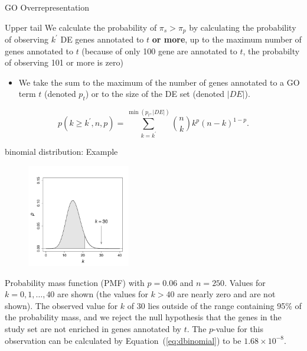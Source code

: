 \documentclass{beamer}
\begin{document}
\begin{frame}{GO Overrepresentation }
\begin{mybluebox}{Upper tail}
We calculate the probability of $\pi_{s}>\pi_p $ by calculating the probability of observing $k^{'}$ DE genes annotated to $t$ {\bf or more}, up to the maximum number of genes annotated to $t$ (because of only 100 gene are annotated to $t$, the probabilty of observing 101 or more is zero)
\end{mybluebox}

\begin{itemize}
\item  We take the sum to the maximum of the
number of genes annotated to a GO term $t$ (denoted $p_t$) or to the
size of the DE set (denoted $|\textit{DE}|$). 
\end{itemize}



\begin{equation}
 \label{eq:tailsumdbinomial}
p(k \geq k^{'},n,p) = \sum_{k=k^{'}}^{\min(p_t,|\textit{DE}|)}\binom{n}{k} 
k^p\left(n-k\right)^{1-p}.
\end{equation}  
 
 
\end{frame}

\begin{frame}{binomial distribution: Example}
 \begin{figure}[h!]
 \centering
 \includegraphics[width=0.4\textwidth]{img/Gobinom.pdf}
\end{figure}
\begin{scriptsize}Probability mass function (PMF)  with $p=0.06$ and
   $n=250$. Values for $k=0,1,\ldots,40$ are shown (the values for
   $k>40$ are nearly zero and are not shown). The observed value for
   $k$ of 30 lies outside of the range containing 95\% of the
   probability mass, and we reject the null hypothesis that the genes
   in the study set are not enriched in genes annotated by $t$. The
   $p$-value for this observation can be calculated by
   Equation~(\ref{eq:dbinomial}) to be $1.68\times 10^{-8}$.\end{scriptsize}
 
\end{frame}
\end{document}
